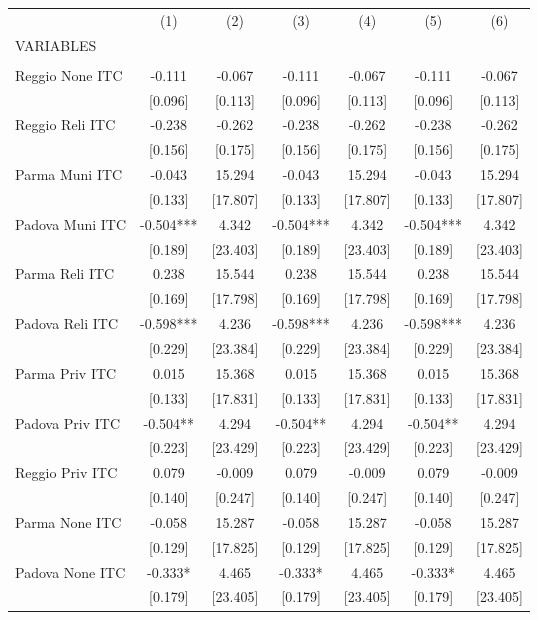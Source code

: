 \begin{tabular}{lcccccc} \hline
 & (1) & (2) & (3) & (4) & (5) & (6) \\
VARIABLES &  &  &  &  &  &  \\ \hline
 &  &  &  &  &  &  \\
Reggio None ITC & -0.111 & -0.067 & -0.111 & -0.067 & -0.111 & -0.067 \\
 & [0.096] & [0.113] & [0.096] & [0.113] & [0.096] & [0.113] \\
Reggio Reli ITC & -0.238 & -0.262 & -0.238 & -0.262 & -0.238 & -0.262 \\
 & [0.156] & [0.175] & [0.156] & [0.175] & [0.156] & [0.175] \\
Parma Muni ITC & -0.043 & 15.294 & -0.043 & 15.294 & -0.043 & 15.294 \\
 & [0.133] & [17.807] & [0.133] & [17.807] & [0.133] & [17.807] \\
Padova Muni ITC & -0.504*** & 4.342 & -0.504*** & 4.342 & -0.504*** & 4.342 \\
 & [0.189] & [23.403] & [0.189] & [23.403] & [0.189] & [23.403] \\
Parma Reli ITC & 0.238 & 15.544 & 0.238 & 15.544 & 0.238 & 15.544 \\
 & [0.169] & [17.798] & [0.169] & [17.798] & [0.169] & [17.798] \\
Padova Reli ITC & -0.598*** & 4.236 & -0.598*** & 4.236 & -0.598*** & 4.236 \\
 & [0.229] & [23.384] & [0.229] & [23.384] & [0.229] & [23.384] \\
Parma Priv ITC & 0.015 & 15.368 & 0.015 & 15.368 & 0.015 & 15.368 \\
 & [0.133] & [17.831] & [0.133] & [17.831] & [0.133] & [17.831] \\
Padova Priv ITC & -0.504** & 4.294 & -0.504** & 4.294 & -0.504** & 4.294 \\
 & [0.223] & [23.429] & [0.223] & [23.429] & [0.223] & [23.429] \\
Reggio Priv ITC & 0.079 & -0.009 & 0.079 & -0.009 & 0.079 & -0.009 \\
 & [0.140] & [0.247] & [0.140] & [0.247] & [0.140] & [0.247] \\
Parma None ITC & -0.058 & 15.287 & -0.058 & 15.287 & -0.058 & 15.287 \\
 & [0.129] & [17.825] & [0.129] & [17.825] & [0.129] & [17.825] \\
Padova None ITC & -0.333* & 4.465 & -0.333* & 4.465 & -0.333* & 4.465 \\
 & [0.179] & [23.405] & [0.179] & [23.405] & [0.179] & [23.405] \\

\end{tabular}
